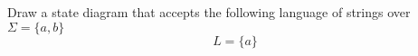 Draw a state diagram that accepts the following
language of strings over $\Sigma =
\{ a, b \}$ 
\[
L = \{a\}
\]
